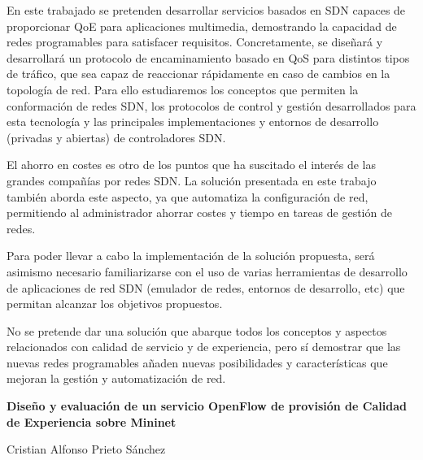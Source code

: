 En este trabajado se pretenden desarrollar servicios basados en \ac{SDN} capaces de proporcionar \ac{QoE} para aplicaciones multimedia, demostrando la capacidad de redes programables para satisfacer requisitos. Concretamente, se diseñará y desarrollará un protocolo de encaminamiento basado en QoS para distintos tipos de tráfico, que sea capaz de reaccionar rápidamente en caso de cambios en la topología de red. Para ello estudiaremos los conceptos que permiten la conformación de redes \ac{SDN}, los protocolos de control y gestión desarrollados para esta tecnología y las principales implementaciones y entornos de desarrollo (privadas y abiertas) de controladores \ac{SDN}.

El ahorro en costes es otro de los puntos que ha suscitado el interés de las grandes compañías por redes \ac{SDN}. La solución presentada en este trabajo también aborda este aspecto, ya que automatiza la configuración de red, permitiendo al administrador ahorrar costes y tiempo en tareas de gestión de redes.  

Para poder llevar a cabo la implementación de la solución propuesta, será asimismo necesario familiarizarse con el uso de varias herramientas de desarrollo de aplicaciones de red SDN (emulador de redes, entornos de desarrollo, etc) que permitan alcanzar los objetivos propuestos. 

No se pretende dar una solución que abarque todos los conceptos y aspectos relacionados con calidad de servicio y de experiencia, pero sí demostrar que las nuevas redes programables añaden nuevas posibilidades y características que mejoran la gestión y automatización de red.

\cleardoublepage


\thispagestyle{empty}


\begin{center}
{\large\bfseries Diseño y evaluación de un servicio OpenFlow de provisión de Calidad de Experiencia sobre Mininet}\\
\end{center}
\begin{center}
Cristian Alfonso Prieto Sánchez\\
\end{center}

\\

\vspace{0.7cm}
\\

